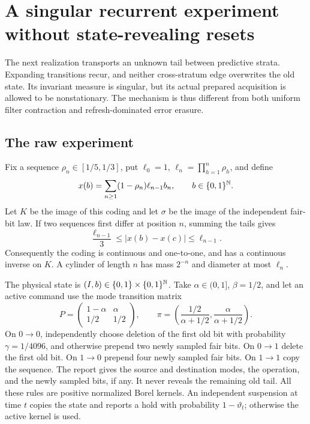\section{A singular recurrent experiment without state-revealing resets}\label{sec:nr-moran}
The next realization transports an unknown tail between predictive strata. Expanding transitions recur, and neither cross-stratum edge overwrites the old state. Its invariant measure is singular, but its actual prepared acquisition is allowed to be nonstationary. The mechanism is thus different from both uniform filter contraction and refresh-dominated error erasure.

\subsection{The raw experiment}
Fix a sequence $\rho_n\in[1/5,1/3]$, put $\ell_0=1$, $\ell_n=\prod_{h=1}^n\rho_h$, and define
\begin{equation}\label{eq:nr-code}
 x(b)=\sum_{n\ge1}(1-\rho_n)\ell_{n-1}b_n,
 \qquad b\in\{0,1\}^{\mathbb N}.
\end{equation}
Let $K$ be the image of this coding and let $\sigma$ be the image of the independent fair-bit law. If two sequences first differ at position $n$, summing the tails gives
\begin{equation}\label{eq:nr-gap}
 \frac{\ell_{n-1}}3\le |x(b)-x(c)|\le\ell_{n-1}.
\end{equation}
Consequently the coding is continuous and one-to-one, and has a continuous inverse on $K$. A cylinder of length $n$ has mass $2^{-n}$ and diameter at most $\ell_n$.

The physical state is $(I,b)\in\{0,1\}\times\{0,1\}^{\mathbb N}$. Take $\alpha\in(0,1]$, $\beta=1/2$, and let an active command use the mode transition matrix
\begin{equation}\label{eq:nr-mode}
 P=\begin{pmatrix}1-\alpha&\alpha\\[1mm]1/2&1/2\end{pmatrix},
 \qquad \pi=\left(\frac{1/2}{\alpha+1/2},\frac{\alpha}{\alpha+1/2}\right).
\end{equation}
On $0\to0$, independently choose deletion of the first old bit with probability $\gamma=1/4096$, and otherwise prepend two newly sampled fair bits. On $0\to1$ delete the first old bit. On $1\to0$ prepend four newly sampled fair bits. On $1\to1$ copy the sequence. The report gives the source and destination modes, the operation, and the newly sampled bits, if any. It never reveals the remaining old tail. All these rules are positive normalized Borel kernels. An independent suspension at time $t$ copies the state and reports a hold with probability $1-\vartheta_t$; otherwise the active kernel is used.


